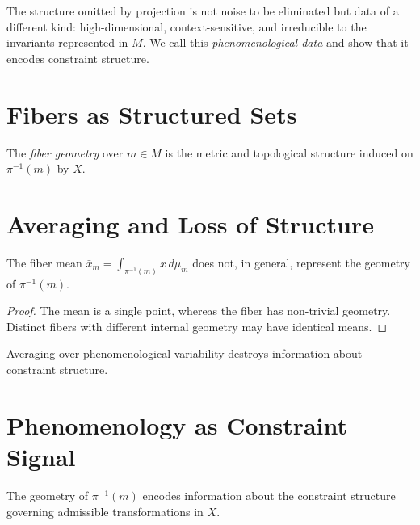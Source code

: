 \documentclass[11pt,openany]{book}
\begin{document}
The structure omitted by projection is not noise to be
eliminated but data of a different kind: high-dimensional,
context-sensitive, and irreducible to the invariants
represented in $M$. We call this \emph{phenomenological
data} and show that it encodes constraint structure.

\section{Fibers as Structured Sets}
\label{sec:fibers-structure}

\begin{definition}
\label{def:fiber-geometry}
The \emph{fiber geometry} over $m \in M$ is the metric and
topological structure induced on $\pi^{-1}(m)$ by $X$.
\end{definition}

\section{Averaging and Loss of Structure}
\label{sec:averaging}

\begin{proposition}
\label{prop:mean}
The fiber mean $\bar{x}_m = \int_{\pi^{-1}(m)} x \, d\mu_m$
does not, in general, represent the geometry of
$\pi^{-1}(m)$.
\end{proposition}

\begin{proof}
The mean is a single point, whereas the fiber has
non-trivial geometry. Distinct fibers with different
internal geometry may have identical means.
\end{proof}

\begin{corollary}
Averaging over phenomenological variability destroys
information about constraint structure.
\end{corollary}

\section{Phenomenology as Constraint Signal}
\label{sec:phenomenology-signal}

\begin{proposition}
\label{prop:constraint-encoding}
The geometry of $\pi^{-1}(m)$ encodes information about
the constraint structure governing admissible
transformations in $X$.
\end{proposition}
\end{document}
